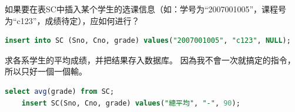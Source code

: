 \documentclass[12pt, a4paper]{report}
\begin{document}
如果要在表SC中插入某个学生的选课信息（如：学号为“2007001005”，课程号为“c123”，成绩待定），应如何进行？\\

\begin{lstlisting}[language=SQL]
    insert into SC (Sno, Cno, grade) values("2007001005", "c123", NULL);
\end{lstlisting}

\begin{figure}[H] %
    \centering %
\end{figure}

求各系学生的平均成绩，并把结果存入数据库。
因為我不會一次就搞定的指令，所以只好一個一個輸。\\

\begin{lstlisting}[language=SQL]
    select avg(grade) from SC;
    insert SC(Sno, Cno, grade) values("總平均", "-", 90);
\end{lstlisting}

\begin{figure}[H] %
    \centering %
\end{figure}
\end{document}
